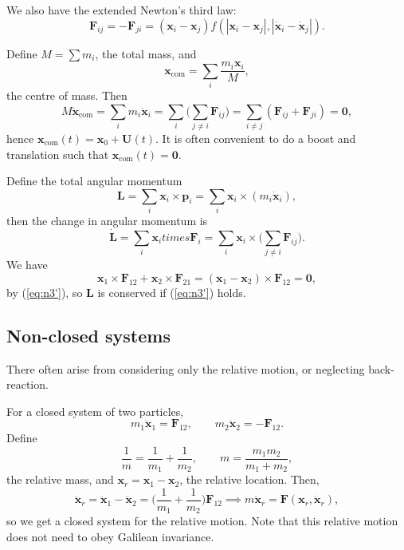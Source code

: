 \documentclass[12pt]{article}
\begin{document}
We also have the extended Newton's third law:
\[
	\mathbf{F}_{ij} = -\mathbf{F}_{ji} = (\mathbf{x}_i - \mathbf{x}_j) f(|\mathbf{x}_i - \mathbf{x}_j|, |\mathbf{\dot x}_i - \mathbf{\dot x}_j|). \tag{N3'}\label{eq:n3'}
\]

Define $M = \sum m_i$, the total mass, and
\[
	\mathbf{x}_{\mathrm{com}} = \sum_i \frac{m_i \mathbf{x}_i}{M},
\]
the centre of mass. Then
\[
M \mathbf{\ddot x}_{\mathrm{com}} = \sum_{i} m_i \mathbf{\ddot x}_i = \sum_i \Biggl( \sum_{j \neq i} \mathbf{F}_{ij} \Biggr) = \sum_{i \neq j} (\mathbf{F}_{ij} + \mathbf{F}_{ji}) = \mathbf{0},
\]
hence $\mathbf{x}_{\mathrm{com}}(t) = \mathbf{x}_0 + \mathbf{U}(t)$. It is often convenient to do a boost and translation such that $\mathbf{x}_{\mathrm{com}}(t) = \mathbf{0}$.

Define the total angular momentum
\[
\mathbf{L} = \sum_i \mathbf{x}_i \times \mathbf{p}_i = \sum_i \mathbf{x}_i \times (m_i \mathbf{\dot x}_i),
\]
then the change in angular momentum is
\[
\mathbf{\dot L} = \sum_i \mathbf{x}_i times \mathbf{F}_i = \sum _i \mathbf{x}_i \times \Biggl( \sum_{j \neq i} \mathbf{F}_{ij} \Biggr).
\]
We have
\[
\mathbf{x}_1 \times \mathbf{F}_{12} + \mathbf{x}_2 \times \mathbf{F}_{21} = (\mathbf{x}_1 - \mathbf{x}_2) \times \mathbf{F}_{12} = \mathbf{0},
\]
by (\ref{eq:n3'}), so $\mathbf{L}$ is conserved if (\ref{eq:n3'}) holds.

\subsection{Non-closed systems}
\label{sub:non_closed_systems}

There often arise from considering only the relative motion, or neglecting back-reaction.

For a closed system of two particles,
\[
m_1 \mathbf{\ddot x}_1 = \mathbf{F}_{12}, \qquad m_2 \mathbf{\ddot x}_2 = - \mathbf{F}_{12}.
\]
Define
\[
\frac{1}{m} = \frac{1}{m_1} + \frac{1}{m_2}, \qquad m = \frac{m_1m_2}{m_1 + m_2},
\]
the relative mass, and $\mathbf{x}_r = \mathbf{x}_1 - \mathbf{x}_2$, the relative location. Then,
\[
\mathbf{\ddot x}_r = \mathbf{\ddot x}_1 - \mathbf{\ddot x}_2 = \biggl( \frac{1}{m_1} + \frac{1}{m_2} \biggr) \mathbf{F}_{12} \implies m \mathbf{\ddot x}_r = \mathbf{F}(\mathbf{x}_r, \mathbf{\dot x}_r),
\]
so we get a closed system for the relative motion. Note that this relative motion does not need to obey Galilean invariance.
\end{document}
